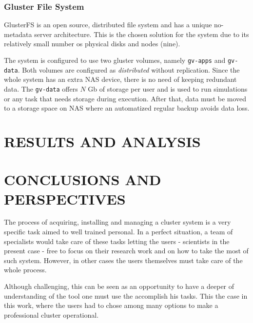 \documentclass[twoside,a4paper,12pt,english]{inac19}
\begin{document}
\subsubsection{Gluster File System}

GlusterFS\cite{gluster} is an open source, distributed file system and has
a unique no-metadata server architecture. This is the chosen solution for the system due to its relatively
small number os physical disks and nodes (nine).

The system is configured to use two gluster volumes, namely \texttt{gv-apps} and \texttt{gv-data}. Both volumes
are configured as \textit{distributed} without replication. Since the whole system has an extra NAS device, there is
no need of keeping redundant data. The \texttt{gv-data} offers $N$ Gb of storage per user and is used to run simulations or any task that needs storage during execution. After that, data must be moved to a storage space on NAS where an automatized regular backup
avoids data loss.



\section{RESULTS AND ANALYSIS}


\section{CONCLUSIONS AND PERSPECTIVES}


The process of acquiring, installing and managing a cluster system is a very specific task aimed to well trained
personal. In a perfect situation, a team of specialists would take care of these tasks letting the users - scientists in the present case -
free to focus on their research work and on how to take the most of such system. However, in other cases the users themselves must
take care of the whole process.

Although challenging, this can be seen as an opportunity to have a deeper of understanding of the tool one must use the accomplish his tasks.
This the case in this work, where the users had to chose among many options to make a professional cluster operational.
\end{document}
